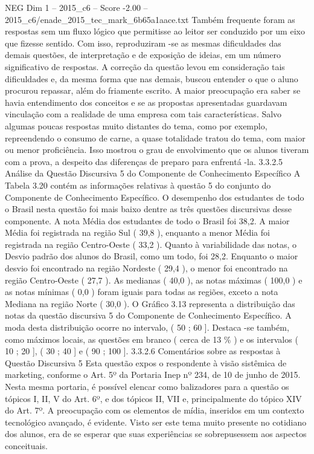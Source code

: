 \begin{textsample}{NEG Dim 1 – 2015\_c6 – Score -2.00 – 2015\_c6/enade\_2015\_tec\_mark\_6b65a1aace.txt}
Também frequente foram as respostas sem um fluxo lógico que permitisse ao leitor ser conduzido por um eixo que fizesse sentido.
Com isso, reproduziram -se as mesmas dificuldades das demais questões, de interpretação e de exposição de ideias, em um número significativo de respostas.
A correção da questão levou em consideração tais dificuldades e, da mesma forma que nas demais, buscou entender o que o aluno procurou repassar, além do friamente escrito.
A maior preocupação era saber se havia entendimento dos conceitos e se as propostas apresentadas guardavam vinculação com a realidade de uma empresa com tais características.
Salvo algumas poucas respostas muito distantes do tema, como por exemplo, repreendendo o consumo de carne, a quase totalidade tratou do tema, com maior ou menor proficiência.
Isso mostrou o grau de envolvimento que os alunos tiveram com a prova, a despeito das diferenças de preparo para enfrentá -la. 3.3.2.5 Análise da Questão Discursiva 5 do Componente de Conhecimento Específico A Tabela 3.20 contém as informações relativas à questão 5 do conjunto do Componente de Conhecimento Específico.
O desempenho dos estudantes de todo o Brasil nesta questão foi mais baixo dentre as três questões discursivas desse componente.
A nota Média dos estudantes de todo o Brasil foi 38,2.
A maior Média foi registrada na região Sul ( 39,8 ), enquanto a menor Média foi registrada na região Centro-Oeste ( 33,2 ).
Quanto à variabilidade das notas, o Desvio padrão dos alunos do Brasil, como um todo, foi 28,2.
Enquanto o maior desvio foi encontrado na região Nordeste ( 29,4 ), o menor foi encontrado na região Centro-Oeste ( 27,7 ).
As medianas ( 40,0 ), as notas máximas ( 100,0 ) e as notas mínimas ( 0,0 ) foram iguais para todas as regiões, exceto a nota Mediana na região Norte ( 30,0 ).
O Gráfico 3.13 representa a distribuição das notas da questão discursiva 5 do Componente de Conhecimento Específico.
A moda desta distribuição ocorre no intervalo, ( 50 ; 60 ].
Destaca -se também, como máximos locais, as questões em branco ( cerca de 13 \% ) e os intervalos ( 10 ; 20 ], ( 30 ; 40 ] e ( 90 ; 100 ]. 3.3.2.6 Comentários sobre as respostas à Questão Discursiva 5 Esta questão expos o respondente à visão sistêmica de marketing, conforme o Art. 5º da Portaria Inep nº 234, de 10 de junho de 2015.
Nesta mesma portaria, é possível elencar como balizadores para a questão os tópicos I, II, V do Art. 6º, e dos tópicos II, VII e, principalmente do tópico XIV do Art. 7º.
A preocupação com os elementos de mídia, inseridos em um contexto tecnológico avançado, é evidente.
Visto ser este tema muito presente no cotidiano dos alunos, era de se esperar que suas experiências se sobrepusessem aos aspectos conceituais.

\end{textsample}

